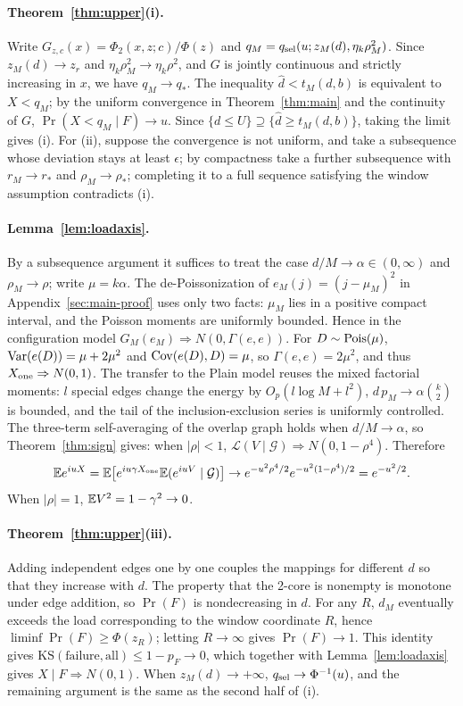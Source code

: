 \paragraph{Theorem~\ref{thm:upper}(i).} Write
$G_{z,c}(x)=\Phi_2(x,z;c)/\Phi(z)$ and $q_M=q_{\rm sel}(u;z_M(d),\eta_k\rho_M^2)$. Since
$z_M(d)\to z_r$ and $\eta_k\rho_M^2\to\eta_k\rho^2$, and $G$ is jointly continuous and strictly
increasing in $x$, we have $q_M\to q_*$. The inequality $\widehat d<t_M(d,b)$ is equivalent to
$X<q_M$; by the uniform convergence in Theorem~\ref{thm:main} and the continuity of $G$,
$\Pr(X<q_M\mid F)\to u$. Since $\{d\le U\}\supseteq\{\widehat d\ge t_M(d,b)\}$, taking the limit
gives (i). For (ii), suppose the convergence is not uniform, and take a subsequence whose deviation
stays at least $\epsilon$; by compactness take a further subsequence with $r_M\to r_*$ and
$\rho_M\to\rho_*$; completing it to a full sequence satisfying the window assumption contradicts (i).

\paragraph{Lemma~\ref{lem:loadaxis}.} By a subsequence argument it suffices to treat the case
$d/M\to\alpha\in(0,\infty)$ and $\rho_M\to\rho$; write $\mu=k\alpha$. The de-Poissonization of
$e_M(j)=(j-\mu_M)^2$ in Appendix~\ref{sec:main-proof} uses only two facts: $\mu_M$ lies in a
positive compact interval, and the Poisson moments are uniformly bounded. Hence in the configuration
model $G_M(e_M)\Rightarrow N(0,\Gamma(e,e))$. For $D\sim\operatorname{Pois}(\mu)$, $\operatorname{Var}(e(D))=\mu+2\mu^2$ and
$\operatorname{Cov}(e(D),D)=\mu$, so $\Gamma(e,e)=2\mu^2$, and thus $X_{\rm one}\Rightarrow N(0,1)$. The transfer
to the Plain model reuses the mixed factorial moments: $l$ special edges change the energy by
$O_p(l\log M+l^2)$, $d\,p_M\to\alpha\binom k2$ is bounded, and the tail of the inclusion-exclusion
series is uniformly controlled. The three-term self-averaging of the overlap graph holds when
$d/M\to\alpha$, so Theorem~\ref{thm:sign} gives: when $|\rho|<1$,
$\mathcal L(V\mid\mathcal G)\Rightarrow N(0,1-\rho^4)$. Therefore
\begin{equation*}
\mathbb E e^{iuX}=\mathbb E\bigl[e^{iu\gamma X_{\rm one}}\mathbb E(e^{iuV}\mid\mathcal G)\bigr]\to e^{-u^2\rho^4/2}e^{-u^2(1-\rho^4)/2}=e^{-u^2/2}.
\end{equation*}
When $|\rho|=1$, $\mathbb E V^2=1-\gamma^2\to0$.

\paragraph{Theorem~\ref{thm:upper}(iii).} Adding independent edges one by one couples the mappings
for different $d$ so that they increase with $d$. The property that the 2-core is nonempty is
monotone under edge addition, so $\Pr(F)$ is nondecreasing in $d$. For any $R$, $d_M$ eventually
exceeds the load corresponding to the window coordinate $R$, hence $\liminf\Pr(F)\ge\Phi(z_R)$;
letting $R\to\infty$ gives $\Pr(F)\to1$. This identity gives
$\mathrm{KS}(\text{failure},\text{all})\le1-p_F\to0$, which together with Lemma~\ref{lem:loadaxis}
gives $X\mid F\Rightarrow N(0,1)$. When $z_M(d)\to+\infty$, $q_{\rm sel}\to\Phi^{-1}(u)$, and the
remaining argument is the same as the second half of (i).

